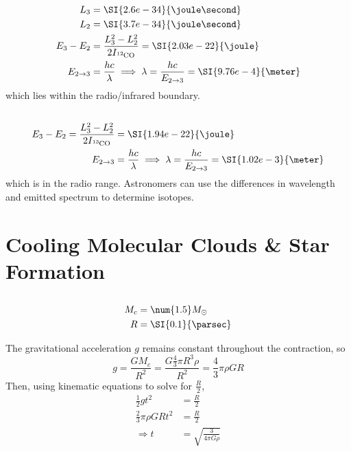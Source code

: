 \documentclass{article}
\begin{document}
\subsection{}

\begin{align}
    L_3 &= \SI{2.6e-34}{\joule\second} \\
    L_2 &= \SI{3.7e-34}{\joule\second} \\
    E_3 - E_2 &= \frac{L_3^2 - L_2^2}{2I_{\ce{^{12}CO}}} = \SI{2.03e-22}{\joule} \\
    E_{2 \to 3} &= \frac{h c}{\lambda} \implies \lambda = \frac{h c}{E_{2 \to 3}} = \SI{9.76e-4}{\meter} \\
\end{align}
which lies within the radio/infrared boundary.

\subsection{}

\begin{align}
    E_3 - E_2 = \frac{L_3^2 - L_2^2}{2I_{\ce{^{13}CO}}} &= \SI{1.94e-22}{\joule} \\
    E_{2 \to 3} &= \frac{h c}{\lambda} \implies \lambda = \frac{h c}{E_{2 \to 3}} = \SI{1.02e-3}{\meter}
\end{align}
which is in the radio range.
Astronomers can use the differences in wavelength and emitted spectrum to determine isotopes.

\section{Cooling Molecular Clouds \& Star Formation}

\subsection{}

\begin{align}
    M_c &= \num{1.5} M_\odot \\
    R &= \SI{0.1}{\parsec}
\end{align}

The gravitational acceleration \(g\) remains constant throughout the contraction, so
\begin{equation}
    g = \frac{G M_c}{R^2} = \frac{G \frac{4}{3} \pi R^3 \rho}{R^2} = \frac{4}{3} \pi \rho G R
\end{equation}
Then, using kinematic equations to solve for \(\frac{R}{2}\),
\begin{align}
    \frac{1}{2} g t^2 &= \frac{R}{2} \\
    \frac{2}{3} \pi \rho G R t^2 &= \frac{R}{2} \\
    \Rightarrow t &= \sqrt{\frac{3}{4 \pi G \rho}}
\end{align}
\end{document}
